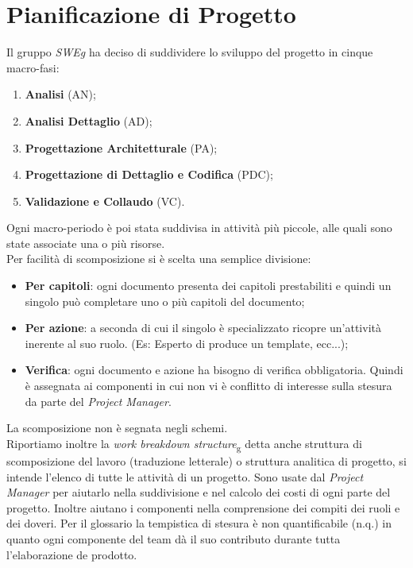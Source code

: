 \documentclass[12pt,a4paper,titlepage]{article}
\begin{document}
			
	\newpage	
	
	\section{Pianificazione di Progetto}
	Il gruppo \textit{SWEg} ha deciso di suddividere lo sviluppo del progetto in cinque macro-fasi:
	\begin{enumerate}
		\item \textbf{Analisi} (AN);
		\item \textbf{Analisi Dettaglio} (AD);
		\item \textbf{Progettazione Architetturale} (PA);
		\item \textbf{Progettazione di Dettaglio e Codifica} (PDC);
		\item \textbf{Validazione e Collaudo} (VC).
	\end{enumerate}
	Ogni macro-periodo è poi stata suddivisa in attività più piccole, alle quali sono state associate una o più risorse. \\
	Per facilità di scomposizione si è scelta una semplice divisione:
	\begin{itemize}
		\item \textbf{Per capitoli}: ogni documento presenta dei capitoli prestabiliti e quindi un singolo può completare uno o più capitoli del documento;
		\item \textbf{Per azione}: a seconda di cui il singolo è specializzato ricopre un'attività inerente al suo ruolo. (Es: Esperto di produce un template, ecc...);
		\item \textbf{Verifica}: ogni documento e azione ha bisogno di verifica obbligatoria. Quindi è assegnata ai componenti in cui non vi è conflitto di interesse sulla stesura da parte del \textit{Project Manager}.
	\end{itemize} 
	La scomposizione non è segnata negli schemi.\\
	Riportiamo inoltre la \textit{work breakdown structure}\textsubscript{g} detta anche struttura di scomposizione del lavoro (traduzione letterale) o struttura analitica di progetto, si intende l'elenco di tutte le attività di un progetto. Sono usate dal \textit{Project Manager} per aiutarlo nella suddivisione e nel calcolo dei costi di ogni parte del progetto. Inoltre aiutano i componenti nella comprensione dei compiti dei ruoli e dei doveri.
	Per il glossario la tempistica di stesura è non quantificabile (n.q.) in quanto ogni componente del team dà il suo contributo durante tutta l'elaborazione de prodotto.
	
\end{document}

